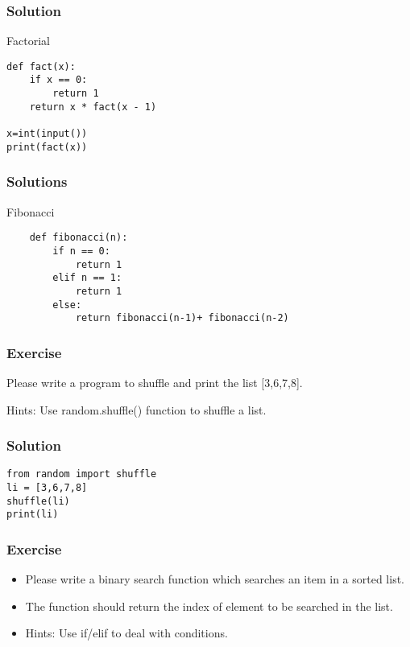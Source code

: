 \begin{frame}[fragile]\frametitle{Solution}
Factorial
  \begin{lstlisting}
def fact(x):
    if x == 0:
        return 1
    return x * fact(x - 1)

x=int(input())
print(fact(x))
  \end{lstlisting}
\end{frame}

\begin{frame}[fragile]\frametitle{Solutions}
Fibonacci
\begin{lstlisting}
    def fibonacci(n):
        if n == 0: 
            return 1
        elif n == 1: 
            return 1
        else: 
            return fibonacci(n-1)+ fibonacci(n-2)
\end{lstlisting}
\end{frame}


\begin{frame}[fragile]\frametitle{Exercise}
Please write a program to shuffle and print the list [3,6,7,8].

Hints:
Use random.shuffle() function to shuffle a list.
\end{frame}

\begin{frame}[fragile]\frametitle{Solution}
\begin{lstlisting}
from random import shuffle
li = [3,6,7,8]
shuffle(li)
print(li)
\end{lstlisting}
\end{frame}


\begin{frame}[fragile]\frametitle{Exercise}
    \begin{itemize}
    \item  Please write a binary search function which searches an item in a sorted list.
    \item The function should return the index of element to be searched in the list.
    \item Hints: Use if/elif to deal with conditions.
    \end{itemize}
\end{frame}

